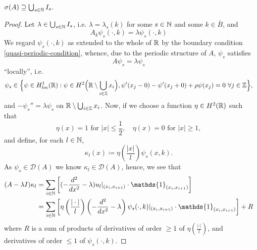 \begin{theorem} \label{4.1:thm-MainResult.FirstInclusion}
	$\sigma(A) \supseteq \bigcup_{s \in \mathbb{N}} I_{s}.$
	
	\begin{proof}
		Let $\lambda \in \bigcup_{s \in \mathbb{N}} I_{s}$, i.e. $\lambda = \lambda_{s}(k)$ for some $s \in \mathbb{N}$ and some $k \in \overline{B}$, and 
		\begin{equation}
			A_{k} \psi_{s}(\cdot, k) = \lambda \psi_{s}(\cdot, k) \label{firstinclusion-firstequation} 
		\end{equation} 
		We regard $\psi_{s}(\cdot, k)$ as extended to the whole of $\mathbb{R}$ by the boundary condition \eqref{quasi-periodic-condition}, whence, due to the periodic structure of $A$, $\psi_{s}$ satisfies
		\[ A \psi_{s} = \lambda \psi_{s} \]
		\enquote{locally}, i.e. 
		\[ \psi_{s} \in \Big\{ \psi \in  H^{1}_{loc}(\mathbb{R}) : \psi \in H^{2}\Big(\mathbb{R} \setminus \bigcup_{i \in \mathbb{Z}} x_{i} \Big), \psi'(x_{j} - 0) - \psi'(x_{j} + 0) + \rho  \psi(x_{j}) = 0 ~\forall j \in \mathbb{Z} \Big\}, \]
		and $ -\psi_{s}'' = \lambda \psi_{s}$ on $\mathbb{R} \setminus \bigcup_{i \in \mathbb{Z}} x_{i}$. Now, if we choose a function $\eta \in H^{2}(\mathbb{R})$ such that 
			\begin{equation}
				\eta(x) = 1 \text{ for } |x| \leq \frac{1}{2}, \quad \eta(x) = 0 \text{ for } |x| \geq 1, \label{eta}
			\end{equation} 
		and define, for each $l \in \mathbb{N}$,
			\[ \kappa_{l}(x) \coloneqq \eta\left(\frac{|x|}{l}\right) \psi_{s}(x, k). \]		
	 	As $\psi_{s} \in \mathcal{D}(A)$ we know $\kappa_{l} \in \mathcal{D}(A)$, hence, we see that
		\begin{align}
			(A - \lambda I) \kappa_{l} & = \sum_{i \in \N} \left[ (- \frac{d^{2}}{dx^{2}} - \lambda) u_{l}|_{(x_{i}, x_{i+1})} \cdot \mathds{1}_{(x_{i}, x_{i+1})} \right] \label{eq:sepofspectraleq} \\
				& = \sum_{i \in \N} \left[ \eta\left(\frac{|\cdot|}{l}\right) \left(- \frac{d^{2}}{dx^{2}} - \lambda \right) \psi_{s}(\cdot, k) |_{(x_{i}, x_{i+1})} \cdot \mathds{1}_{(x_{i}, x_{i+1})} \right] + R \notag
		\end{align}
		where $R$ is a sum of products of derivatives of order $\geq 1$ of $\eta\left(\frac{|\cdot|}{l}\right)$, and derivatives of order $\leq 1$ of $\psi_{s}(\cdot, k)$. 
		

\end{proof}
\end{theorem}
